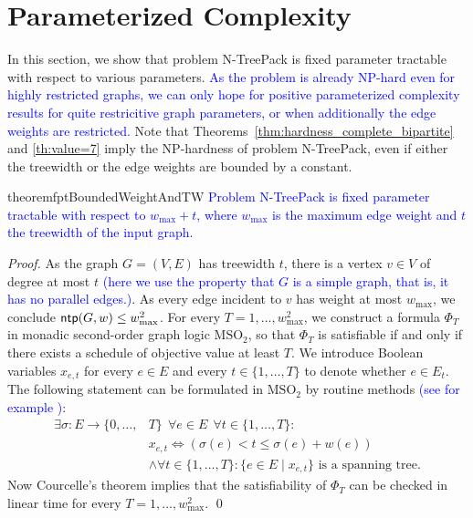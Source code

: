 \documentclass[runningheads]{llncs}
\newcommand{\set}[1]{\{ #1 \}}
\newcommand{\bigO}{\mathcal{O}}
\newcommand{\xxxNTP}{{\sc N-TreePack}}
\DeclareMathOperator{\ntp}{\text{\sf ntp}}
\newcommand{\lasse}[1]{\textcolor{blue}{#1}}
\begin{document}
\section{Parameterized Complexity}
\label{sec:parameterized}
In this section, we show that problem {\xxxNTP} is fixed parameter tractable with 
respect to various parameters. \lasse{As the problem is already NP-hard even for highly restricted graphs,
we can only hope for positive parameterized complexity results for quite restricitive graph parameters,
or when additionally the edge weights are restricted.}
Note that Theorems~\ref{thm:hardness_complete_bipartite} and \ref{th:value=7} imply the NP-hardness 
of problem {\xxxNTP}, even if either the treewidth or the edge weights are bounded by a constant. 

\begin{restatable}{theorem}{fptBoundedWeightAndTW}
\label{th:fpt_weights_and_tw_bounded}
\lasse{Problem {\xxxNTP} is fixed parameter tractable with respect to $w_{\max} + t$, where $w_{\max}$ is the maximum edge weight and $t$ the treewidth of the input graph.}
\end{restatable}
\begin{proof}
As the graph $G=(V,E)$ has treewidth $t$, there is a vertex $v\in V$ of degree at most $t$ \lasse{(here we use the property that $G$ is a simple graph, that is, it has no parallel edges.)}.
As every edge incident to $v$ has weight at most $w_{\max}$, we conclude $\ntp(G,w)\le w_{\max}^2$. 
For every $T=1,\ldots,w_{\max}^2$, we construct a formula $\Phi_T$ in monadic second-order 
graph logic $\text{MSO}_2$, so that $\Phi_T$ is satisfiable if and only if there exists a schedule 
of objective value at least $T$. 
We introduce Boolean variables $x_{e,t}$ for every $e\in E$ and every $t\in \{1,\dots,T\}$
to denote whether $e\in E_t$. 
The following statement can be formulated in $\text{MSO}_2$ by routine methods \lasse{(see for example \cite[chapter 7.4]{cygan2015parameterized})}:
\begin{align*}
\exists \sigma: E\to\{0,\ldots,&T\} ~~\forall e\in E ~~\forall t\in\{1,\ldots,T\}: \\
& x_{e,t} \iff \left(\sigma(e) < t \leq \sigma(e) + w(e)\right)\\
& \land \forall t\in\{1,\ldots,T\}: \set{e\in E \mid x_{e,t}} \text{ is a spanning tree.}
\end{align*}
Now Courcelle's theorem \cite{courcelle1990monadic} implies that the satisfiability of $\Phi_T$ 
can be checked in linear time for every $T=1,\ldots,w_{\max}^2$.
\qed
\end{proof}
\end{document}
